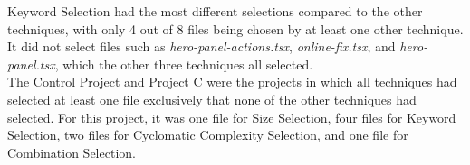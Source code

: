 Keyword Selection had the most different selections compared to the other techniques, with only 4 out of 8 files being chosen by at least one other technique. It did not select files such as \textit{hero-panel-actions.tsx}, \textit{online-fix.tsx}, and \textit{hero-panel.tsx}, which the other three techniques all selected. \\

The Control Project and Project C were the projects in which all techniques had selected at least one file exclusively that none of the other techniques had selected. For this project, it was one file for Size Selection, four files for Keyword Selection, two files for Cyclomatic Complexity Selection, and one file for Combination Selection.